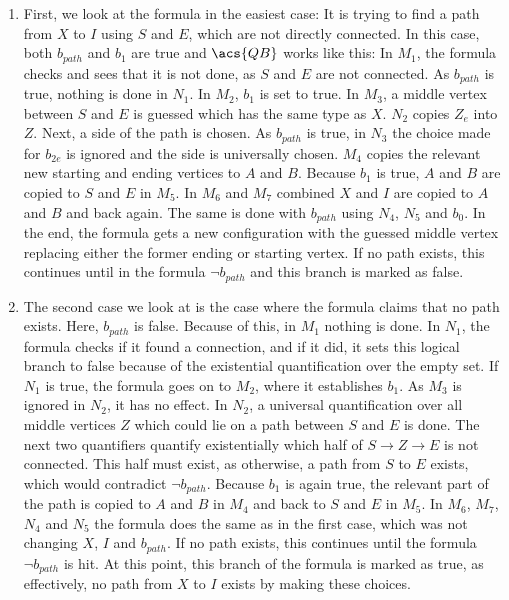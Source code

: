 \begin{enumerate}
    \item First, we look at the formula in the easiest case: It is trying to find a path from $X$ to $I$ using $S$ and $E$, which are not directly connected.
    In this case, both $b_{path}$ and $b_1$ are true and $\acs{QB}$ works like this:
    In $M_1$, the formula checks and sees that it is not done, as $S$ and $E$ are not connected.
    As $b_{path}$ is true, nothing is done in $N_1$.
    In $M_2$, $b_1$ is set to true.
    In $M_3$, a middle vertex between $S$ and $E$ is guessed which has the same type as $X$.
    $N_2$ copies $Z_e$ into $Z$.
    Next, a side of the path is chosen.
    As $b_{path}$ is true, in $N_3$ the choice made for $b_{2e}$ is ignored and the side is universally chosen.
    $M_4$ copies the relevant new starting and ending vertices to $A$ and $B$.
    Because $b_1$ is true, $A$ and $B$ are copied to $S$ and $E$ in $M_5$.
    In $M_6$ and $M_7$ combined  $X$ and $I$ are copied to $A$ and $B$ and back again.
    The same is done with $b_{path}$ using $N_4$, $N_5$ and $b_0$.
    In the end, the formula gets a new configuration with the guessed middle vertex replacing either the former ending or starting vertex.
    If no path exists, this continues until in the formula $\neg b_{path}$ and this branch is marked as false.

    \item The second case we look at is the case where the formula claims that no path exists.
    Here, $b_{path}$ is false.
    Because of this, in $M_1$ nothing is done.
    In $N_1$, the formula checks if it found a connection, and if it did, it sets this logical branch to false because of the existential quantification over the empty set.
    If $N_1$ is true, the formula goes on to $M_2$, where it establishes $b_1$.
    As $M_3$ is ignored in $N_2$, it has no effect.
    In $N_2$, a universal quantification over all middle vertices $Z$ which could lie on a path between $S$ and $E$ is done.
    The next two quantifiers quantify existentially which half of $S \to Z \to E$ is not connected.
    This half must exist, as otherwise, a path from $S$ to $E$ exists, which would contradict $\neg b_{path}$.
    Because $b_1$ is again true, the relevant part of the path is copied to $A$ and $B$ in $M_4$ and back to $S$ and $E$ in $M_5$.
    In $M_6$, $M_7$, $N_4$ and $N_5$ the formula does the same as in the first case, which was not changing $X$, $I$ and $b_{path}$.
    If no path exists, this continues until the formula $\neg b_{path}$ is hit.
    At this point, this branch of the formula is marked as true, as effectively, no path from $X$ to $I$ exists by making these choices.


\end{enumerate}
